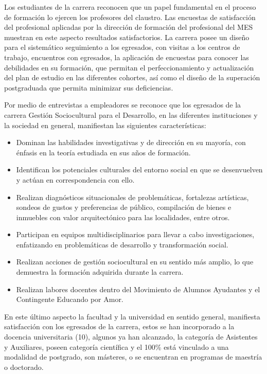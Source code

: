 Los estudiantes de la carrera reconocen que un papel fundamental en el proceso de formación lo ejercen los profesores del claustro. Las encuestas de satisfacción del profesional aplicadas por la dirección de formación del profesional del MES muestran en este aspecto resultados satisfactorios. La carrera posee un diseño para el sistemático seguimiento a los egresados, con visitas a los centros de trabajo, encuentros con egresados, la aplicación de encuestas para conocer las debilidades en su formación, que permitan el perfeccionamiento y actualización del plan de estudio en las diferentes cohortes, así como el diseño de la superación postgraduada que permita minimizar sus deficiencias. 

Por medio de entrevistas a empleadores se reconoce que los egresados de la carrera Gestión Sociocultural para el Desarrollo, en las diferentes instituciones y la sociedad en general, manifiestan las siguientes características: 

\begin{itemize}
	\item Dominan las habilidades investigativas y de dirección en su mayoría, con énfasis en la teoría estudiada en sus años de formación.
	\item Identifican los potenciales culturales del entorno social en que se desenvuelven y actúan en correspondencia con ello.
	\item Realizan diagnósticos situacionales de problemáticas, fortalezas artísticas, sondeos de gustos y preferencias de público, compilación de bienes e inmuebles con valor arquitectónico para las localidades, entre otros.
	\item Participan en equipos multidisciplinarios para llevar a cabo investigaciones, enfatizando en problemáticas de desarrollo y transformación social.
	\item Realizan acciones de gestión sociocultural en su sentido más amplio, lo que demuestra la formación adquirida durante la carrera.
	\item Realizan labores docentes dentro del Movimiento de Alumnos Ayudantes y el Contingente Educando por Amor.
\end{itemize}

En este último aspecto la facultad y la universidad en sentido general, manifiesta satisfacción con los egresados de la carrera, estos se han incorporado a la docencia universitaria (10), algunos ya han alcanzado, la categoría de Asistentes y Auxiliares, poseen categoría científica y el 100\% está vinculado a una modalidad de postgrado, son másteres, o se encuentran en programas de maestría o doctorado.

